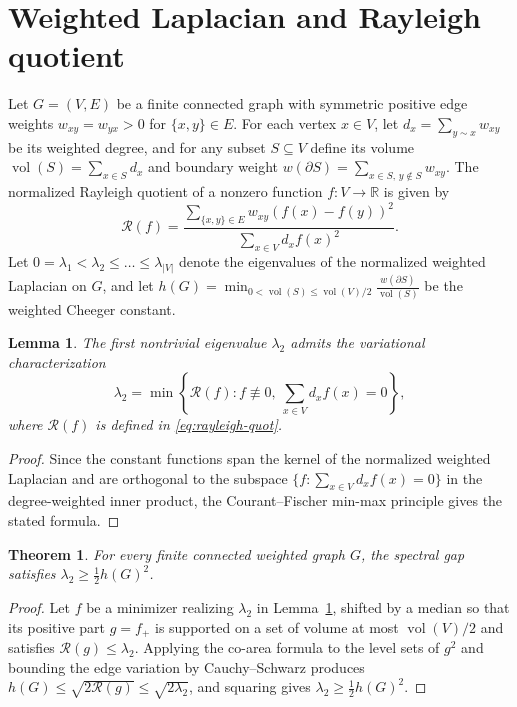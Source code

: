 \documentclass{article}
\newtheorem{theorem}{Theorem}
\newtheorem{lemma}{Lemma}
\begin{document}
\section{Weighted Laplacian and Rayleigh quotient}
\label{sec:laplacian}
Let $G = (V, E)$ be a finite connected graph with symmetric positive edge
weights $w_{xy} = w_{yx} > 0$ for $\{x,y\} \in E$. For each vertex $x \in V$,
let $d_x = \sum_{y \sim x} w_{xy}$ be its weighted degree, and for any subset
$S \subseteq V$ define its volume $\operatorname{vol}(S) = \sum_{x \in S} d_x$
and boundary weight $w(\partial S) = \sum_{x \in S,\, y \notin S} w_{xy}$.
The normalized Rayleigh quotient of a nonzero function $f : V \to \mathbb{R}$
is given by
\begin{equation}
\label{eq:rayleigh-quot}
\mathcal{R}(f) = \frac{\sum_{\{x,y\} \in E} w_{xy} (f(x) - f(y))^2}{\sum_{x \in V} d_x f(x)^2}.
\end{equation}
Let $0 = \lambda_1 < \lambda_2 \le \dots \le \lambda_{|V|}$ denote the
eigenvalues of the normalized weighted Laplacian on $G$, and let
$h(G) = \min_{0 < \operatorname{vol}(S) \le \operatorname{vol}(V)/2}
\frac{w(\partial S)}{\operatorname{vol}(S)}$ be the weighted Cheeger constant.

\begin{lemma}
\label{lem:rayleigh}
The first nontrivial eigenvalue $\lambda_2$ admits the variational
characterization
\[
\lambda_2 = \min \left\{ \mathcal{R}(f) : f \not\equiv 0,\ \sum_{x \in V} d_x f(x) = 0 \right\},
\]
where $\mathcal{R}(f)$ is defined in \eqref{eq:rayleigh-quot}.
\end{lemma}
\begin{proof}
Since the constant functions span the kernel of the normalized weighted
Laplacian and are orthogonal to the subspace $\{f : \sum_{x \in V} d_x f(x) = 0\}$
in the degree-weighted inner product, the Courant--Fischer min-max principle
gives the stated formula.
\end{proof}

\begin{theorem}
\label{thm:spectral-lower}
For every finite connected weighted graph $G$, the spectral gap satisfies
$\lambda_2 \ge \frac{1}{2} h(G)^2$.
\end{theorem}
\begin{proof}
Let $f$ be a minimizer realizing $\lambda_2$ in Lemma~\ref{lem:rayleigh},
shifted by a median so that its positive part $g = f_+$ is supported on a set
of volume at most $\operatorname{vol}(V)/2$ and satisfies $\mathcal{R}(g) \le \lambda_2$.
Applying the co-area formula to the level sets of $g^2$ and bounding the edge
variation by Cauchy--Schwarz produces $h(G) \le \sqrt{2 \mathcal{R}(g)} \le \sqrt{2\lambda_2}$,
and squaring gives $\lambda_2 \ge \frac{1}{2} h(G)^2$.
\end{proof}
\end{document}
